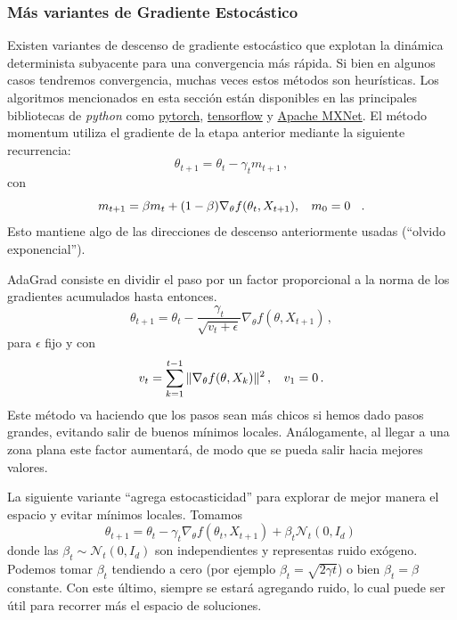 \documentclass[letterpaper,11pt]{article} %
\def\espacio{\hspace{.25cm}\,}
\theoremstyle{defbreak}
\theoremstyle{propbreak}
\theoremstyle{remark}
\theoremstyle{break}
\begin{document}
\subsubsection{Más variantes de Gradiente Estocástico}
Existen variantes de descenso de gradiente estocástico que explotan la dinámica determinista subyacente para una convergencia más rápida. Si bien en algunos casos tendremos convergencia, muchas veces estos métodos son heurísticas. Los algoritmos mencionados en esta sección están disponibles en las principales bibliotecas de \textit{python} como \href{https://pytorch.org/docs/stable/optim.html#algorithms}{pytorch}, \href{https://www.tensorflow.org/api_docs/python/tf/keras/optimizers}{tensorflow} y \href{https://mxnet.apache.org/versions/1.7/api/python/docs/tutorials/packages/optimizer/index.html}{Apache MXNet}.
El método momentum utiliza el gradiente de la etapa anterior mediante la siguiente recurrencia:
$$ \theta_{t+1} = \theta_t - \gamma_t m_{t+1} \,,$$
con
$$ m_{t+1}=\beta m_t+(1-\beta)\nabla_\theta f(\theta_t,X_{t+1}), \espacio m_0=0\espacio .$$
Esto mantiene algo de las direcciones de descenso anteriormente usadas (``olvido exponencial'').

AdaGrad consiste en dividir el paso por un factor proporcional a la norma de los gradientes acumulados hasta entonces.
$$ \theta_{t+1}=\theta_t-\displaystyle \frac{\gamma_t}{\sqrt{v_t+\epsilon}}\nabla_\theta f(\theta,X_{t+1}) \,,$$
para $\epsilon$ fijo y con
$$ v_t = \displaystyle \sum^{t-1}_{k=1}\|\nabla_\theta f(\theta,X_k)\|^2\,,\espacio v_1=0\,.$$
Este método va haciendo que los pasos sean más chicos si hemos dado pasos grandes, evitando salir de buenos mínimos locales. Análogamente, al llegar a una zona plana este factor aumentará, de modo que se pueda salir hacia mejores valores.

La siguiente variante ``agrega estocasticidad'' para explorar de mejor manera el espacio y evitar mínimos locales. Tomamos
$$ \theta_{t+1}=\theta_t-\gamma_t\nabla_\theta f(\theta_t,X_{t+1}) + \beta_t \mathcal{N}_t(0,I_d)\,$$
donde las $ \beta_t\sim \mathcal{N}_t(0,I_d)$ son independientes y representas ruido exógeno. Podemos tomar $\beta_t$ tendiendo a cero (por ejemplo $\beta_t=\sqrt{2\gamma t}$) o bien $\beta_t=\beta$ constante. Con este último, siempre se estará agregando ruido, lo cual puede ser útil para recorrer más el espacio de soluciones.
\end{document}
